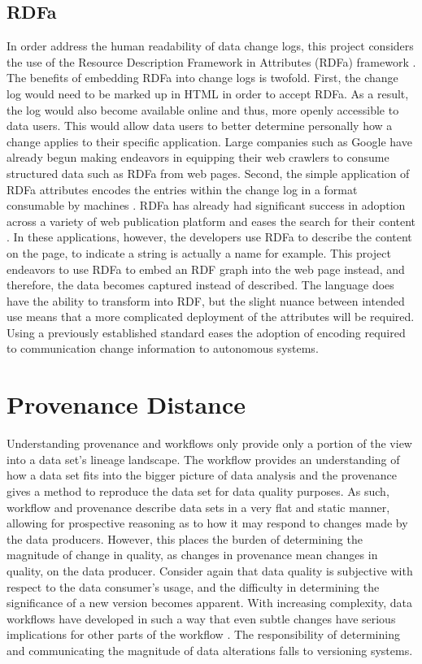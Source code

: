 \subsection{RDFa}

In order address the human readability of data change logs, this project considers the use of the Resource Description Framework in Attributes (RDFa) framework \cite{Adida2015}.
The benefits of embedding RDFa into change logs is twofold.
First, the change log would need to be marked up in HTML in order to accept RDFa.
As a result, the log would also become available online and thus, more openly accessible to data users.
This would allow data users to better determine personally how a change applies to their specific application.
Large companies such as Google have already begun making endeavors in equipping their web crawlers to consume structured data such as RDFa from web pages.
Second, the simple application of RDFa attributes encodes the entries within the change log in a format consumable by machines \cite{Herman2015}.
RDFa has already had significant success in adoption across a variety of web publication platform and eases the search for their content \cite{Bizer2013}.
In these applications, however, the developers use RDFa to describe the content on the page, to indicate a string is actually a name for example.
This project endeavors to use RDFa to embed an RDF graph into the web page instead, and therefore, the data becomes captured instead of described.
The language does have the ability to transform into RDF, but the slight nuance between intended use means that a more complicated deployment of the attributes will be required.
Using a previously established standard eases the adoption of encoding required to communication change information to autonomous systems.

\section{Provenance Distance}

Understanding provenance and workflows only provide only a portion of the view into a data set's lineage landscape.
The workflow provides an understanding of how a data set fits into the bigger picture of data analysis and the provenance gives a method to reproduce the data set for data quality purposes.
As such, workflow and provenance describe data sets in a very flat and static manner, allowing for prospective reasoning as to how it may respond to changes made by the data producers.
However, this places the burden of determining the magnitude of change in quality, as changes in provenance mean changes in quality, on the data producer.
Consider again that data quality is subjective with respect to the data consumer's usage, and the difficulty in determining the significance of a new version becomes apparent.
With increasing complexity, data workflows have developed in such a way that even subtle changes have serious implications for other parts of the workflow \cite{TILMES2011548}.
The responsibility of determining and communicating the magnitude of data alterations falls to versioning systems.

